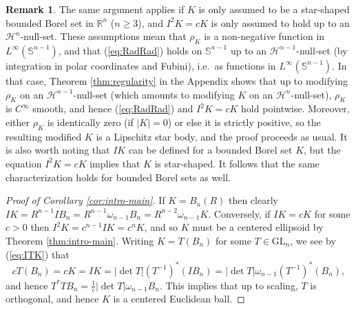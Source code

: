 \documentclass[11pt]{article}
\theoremstyle{definition}
\newtheorem{rem}[thm]{\textbf{Remark}}
\theoremstyle{proof}
\DeclareMathOperator{\+}{\mathop{\tilde{+}}}
\newcommand{\GL}{\textrm{GL}}
\newcommand{\R}{\mathbb{R}}
\renewcommand{\S}{\mathbb{S}}
\renewcommand{\H}{\mathcal{H}}
\numberwithin{equation}{section}
\numberwithin{equation}{section}
\begin{document}
\begin{rem}
The same argument applies if $K$ is only assumed to be a star-shaped bounded Borel set in $\R^n$ ($n \geq 3$), and $I^2 K = c K$ is only assumed to hold up to an $\H^n$-null-set. These assumptions mean that $\rho_K$ is a non-negative function in $L^\infty(\S^{n-1})$, and that (\ref{eq:RadRad}) holds on $\S^{n-1}$ up to an $\H^{n-1}$-null-set (by integration in polar coordinates and Fubini), i.e.~as functions in $L^\infty(\S^{n-1})$. In that case, Theorem \ref{thm:regularity} in the Appendix shows that up to modifying $\rho_K$ on an $\H^{n-1}$-null-set (which amounts to modifying $K$ on an $\H^n$-null-set), $\rho_K$ is $C^\infty$ smooth, and hence (\ref{eq:RadRad}) and $I^2 K = c K$ hold pointwise. Moreover, either $\rho_K$ is identically zero (if $|K| = 0$) or else it is strictly positive, so the resulting modified $K$ is a Lipschitz star body, and the proof proceeds as usual. 
It is also worth noting that $IK$ can be defined for a bounded Borel set $K$,
but the equation $I^2 K = c K$ implies that $K$ is star-shaped.
It follows that the same characterization holds for bounded Borel sets as well.
\end{rem}

\begin{proof}[Proof of Corollary \ref{cor:intro-main}] 
If $K = B_n(R)$ then clearly $I K = R^{n-1} I B_n = R^{n-1} \omega_{n-1} B_n = R^{n-2} \omega_{n-1} K$. 
Conversely, if $I K = c K$ for some $c > 0$ then $I^2 K = c^{n-1} I K = c^n K$, and so $K$ must be a centered ellipsoid by Theorem \ref{thm:intro-main}. Writing $K = T (B_n)$ for some $T \in \GL_n$, we see by (\ref{eq:ITK}) that
\[
c T(B_n) = c K = I K = |\det T| (T^{-1})^*(I B_n) = |\det T| \omega_{n-1}  (T^{-1})^*(B_n) ,
\]
and hence $T^* T B_n = \frac{1}{c} |\det T| \omega_{n-1} B_n$. This implies that up to scaling, $T$ is orthogonal, and hence $K$ is a centered Euclidean ball. 
\end{proof}
\end{document}
